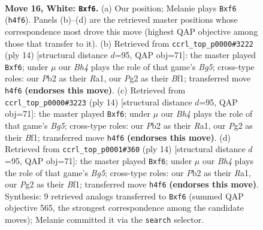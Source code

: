 \documentclass[11pt]{article}
\begin{document}
\clearpage

\begin{figure}[p]\centering
\begin{subfigure}{0.46\textwidth}\centering
\resizebox{\linewidth}{!}{%
\newchessgame
\chessboard[
  setfen={rnbqk2r/5pb1/1p2pnp1/p7/P1NP3B/1BN4P/1P3PP1/R2Q1RK1 w q - 1 16},
  showmover=false,
  pgfstyle=straightmove, color=movearrow, markmove={h4-f6}
]}
\caption{}
\end{subfigure}\hfill
\begin{subfigure}{0.46\textwidth}\centering
\resizebox{\linewidth}{!}{%
\newchessgame
\chessboard[
  setfen={rnbqk2r/ppp2pp1/4pn1p/6B1/2pP4/P1P2N2/4PPPP/R2QKB1R w KQkq - 0 8},
  showmover=false,
  pgfstyle=straightmove, color=movearrow, markmove={g5-f6}
]}
\caption{}
\end{subfigure}
\\[4pt]
\begin{subfigure}{0.46\textwidth}\centering
\resizebox{\linewidth}{!}{%
\newchessgame
\chessboard[
  setfen={rnbqk2r/ppp2pp1/4pn1p/6B1/2pP4/P1P2N2/4PPPP/R2QKB1R w KQkq - 0 8},
  showmover=false,
  pgfstyle=straightmove, color=movearrow, markmove={g5-f6}
]}
\caption{}
\end{subfigure}\hfill
\begin{subfigure}{0.46\textwidth}\centering
\resizebox{\linewidth}{!}{%
\newchessgame
\chessboard[
  setfen={rnbqk2r/ppp2pp1/4pn1p/6B1/2pP4/P1P2N2/4PPPP/R2QKB1R w KQkq - 0 8},
  showmover=false,
  pgfstyle=straightmove, color=movearrow, markmove={g5-f6}
]}
\caption{}
\end{subfigure}
\caption{\textbf{Move 16, White: \texttt{Bxf6}.} (a) Our position; Melanie plays \texttt{Bxf6} (\texttt{h4f6}). Panels (b)--(d) are the retrieved master positions whose correspondence most drove this move (highest QAP objective among those that transfer to it). (b) Retrieved from \texttt{ccrl\_top\_p0000\#3222} (ply 14) [structural distance $d$=95, QAP obj=71]: the master played \texttt{Bxf6}; under $\mu$ our \emph{Bh4} plays the role of that game's \emph{Bg5}; cross-type roles: our \emph{P}b2 as their \emph{R}a1, our \emph{P}g2 as their \emph{B}f1; transferred move \texttt{h4f6} \textbf{(endorses this move)}. (c) Retrieved from \texttt{ccrl\_top\_p0000\#3223} (ply 14) [structural distance $d$=95, QAP obj=71]: the master played \texttt{Bxf6}; under $\mu$ our \emph{Bh4} plays the role of that game's \emph{Bg5}; cross-type roles: our \emph{P}b2 as their \emph{R}a1, our \emph{P}g2 as their \emph{B}f1; transferred move \texttt{h4f6} \textbf{(endorses this move)}. (d) Retrieved from \texttt{ccrl\_top\_p0001\#360} (ply 14) [structural distance $d$=95, QAP obj=71]: the master played \texttt{Bxf6}; under $\mu$ our \emph{Bh4} plays the role of that game's \emph{Bg5}; cross-type roles: our \emph{P}b2 as their \emph{R}a1, our \emph{P}g2 as their \emph{B}f1; transferred move \texttt{h4f6} \textbf{(endorses this move)}. Synthesis: 9 retrieved analogs transferred to \texttt{Bxf6} (summed QAP objective 565, the strongest correspondence among the candidate moves); Melanie committed it via the \texttt{search} selector.}
\label{fig:thought-m30}
\end{figure}
\end{document}
